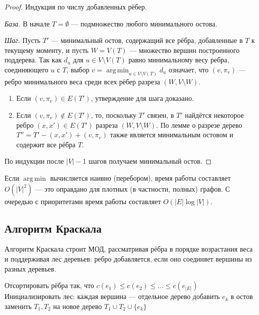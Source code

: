 \begin{proof}
	Индукция по числу добавленных рёбер.
	
	\emph{База.} В начале $T = \emptyset$ --- подмножество любого минимального остова.
	
	\emph{Шаг.} Пусть $T'$ --- минимальный остов, содержащий все рёбра, добавленные в $T$ к текущему моменту, и пусть $W = V(T)$ --- множество вершин построенного поддерева. Так как $d_u$ для $u \in V\setminus V(T)$ равно минимальному весу ребра, соединяющего $u$ с $T$, выбор $v = \operatorname*{arg\,min}_{u \in V\setminus V(T)} d_u$ означает, что $(v, \pi_v)$ --- ребро минимального веса среди всех рёбер разреза $(W, V \setminus W)$.
	\begin{enumerate}
		\item Если $(v, \pi_v) \in E(T')$, утверждение для шага доказано.
		\item Если $(v, \pi_v) \notin E(T')$, то, поскольку $T'$ связен, в $T'$ найдётся некоторое ребро $(x,x') \in E(T')$ разреза $(W, V \setminus W)$. По лемме о разрезе дерево $T'' = T' - (x,x') + (v,\pi_v)$ также является минимальным остовом и содержит все рёбра $T$.
	\end{enumerate}
	По индукции после $|V|-1$ шагов получаем минимальный остов.
\end{proof}

\begin{Remark}{}{}
	Если $\operatorname*{arg\,min}$ вычисляется наивно (перебором), время работы составляет $O(|V|^2)$ --- это оправдано для плотных (в частности, полных) графов. С очередью с приоритетами время работы составляет $O(|E| \log |V|)$.
\end{Remark}

\subsection{Алгоритм Краскала}

Алгоритм Краскала строит МОД, рассматривая рёбра в порядке возрастания веса и поддерживая лес деревьев: ребро добавляется, если оно соединяет вершины из разных деревьев.

\begin{algorithmic}
	\State Отсортировать рёбра так, что $c(e_1) \leq c(e_2) \leq \ldots \leq c(e_{|E|})$
	\State Инициализировать лес: каждая вершина --- отдельное дерево
	\State добавить $e_k$ в остов
	\State заменить $T_1, T_2$ на новое дерево $T_1 \cup T_2 \cup \{e_k\}$
	\EndIf
	\EndFor
\end{algorithmic}

